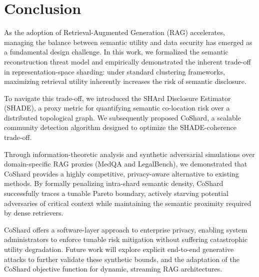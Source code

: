 \section{Conclusion}
\label{sec:conclusion}

As the adoption of Retrieval-Augmented Generation (RAG) accelerates, managing the balance between semantic utility and data security has emerged as a fundamental design challenge. In this work, we formalized the semantic reconstruction threat model and empirically demonstrated the inherent trade-off in representation-space sharding: under standard clustering frameworks, maximizing retrieval utility inherently increases the risk of semantic disclosure. 

To navigate this trade-off, we introduced the SHArd Disclosure Estimator (SHADE), a proxy metric for quantifying semantic co-location risk over a distributed topological graph. We subsequently proposed CoShard, a scalable community detection algorithm designed to optimize the SHADE-coherence trade-off. 

Through information-theoretic analysis and synthetic adversarial simulations over domain-specific RAG proxies (MedQA and LegalBench), we demonstrated that CoShard provides a highly competitive, privacy-aware alternative to existing methods. By formally penalizing intra-shard semantic density, CoShard successfully traces a tunable Pareto boundary, actively starving potential adversaries of critical context while maintaining the semantic proximity required by dense retrievers. 

CoShard offers a software-layer approach to enterprise privacy, enabling system administrators to enforce tunable risk mitigation without suffering catastrophic utility degradation. Future work will explore explicit end-to-end generative attacks to further validate these synthetic bounds, and the adaptation of the CoShard objective function for dynamic, streaming RAG architectures.
